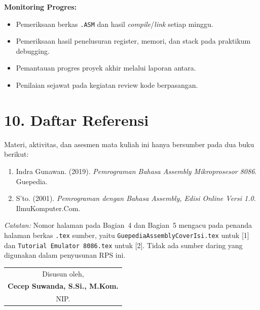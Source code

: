 \documentclass[12pt,a4paper]{article}
\begin{document}
\textbf{Monitoring Progres:}
\begin{itemize}[leftmargin=*]
  \item Pemeriksaan berkas \texttt{.ASM} dan hasil \textit{compile}/\textit{link} setiap minggu.
  \item Pemeriksaan hasil penelusuran register, memori, dan stack pada praktikum debugging.
  \item Pemantauan progres proyek akhir melalui laporan antara.
  \item Penilaian sejawat pada kegiatan review kode berpasangan.
\end{itemize}

\vspace{0.5cm}

\section*{10. Daftar Referensi}

Materi, aktivitas, dan asesmen mata kuliah ini hanya bersumber pada dua buku berikut:

\begin{enumerate}[leftmargin=*]
  \item[{[1]}] Indra Gunawan. (2019). \textit{Pemrograman Bahasa Assembly Mikroprosesor 8086}. Guepedia.

  \item[{[2]}] S'to. (2001). \textit{Pemrograman dengan Bahasa Assembly, Edisi Online Versi 1.0}. IlmuKomputer.Com.
\end{enumerate}

\vspace{0.3cm}

\textit{Catatan:} Nomor halaman pada Bagian~4 dan Bagian~5 mengacu pada penanda halaman berkas \texttt{.tex} sumber, yaitu \texttt{GuepediaAssemblyCoverIsi.tex} untuk [1] dan \texttt{Tutorial Emulator 8086.tex} untuk [2]. Tidak ada sumber daring yang digunakan dalam penyusunan RPS ini.

\vspace{1cm}

\begin{flushright}
\begin{tabular}{c}
Disusun oleh,\\[2cm]
\textbf{Cecep Suwanda, S.Si., M.Kom.}\\
NIP. \dotfill
\end{tabular}
\end{flushright}
\end{document}
